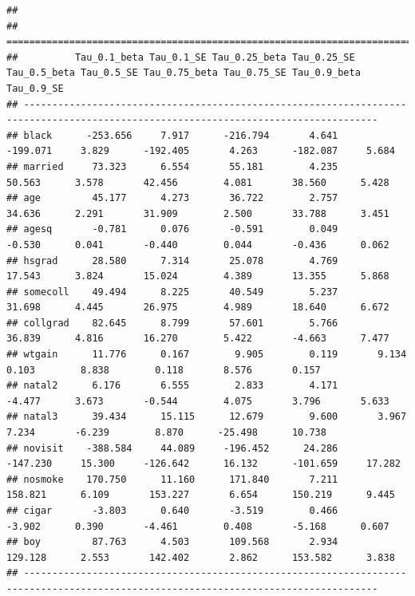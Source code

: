 \documentclass[]{book}
\begin{document}
\begin{verbatim}
## 
## ====================================================================================================================================
##          Tau_0.1_beta Tau_0.1_SE Tau_0.25_beta Tau_0.25_SE Tau_0.5_beta Tau_0.5_SE Tau_0.75_beta Tau_0.75_SE Tau_0.9_beta Tau_0.9_SE
## ------------------------------------------------------------------------------------------------------------------------------------
## black      -253.656     7.917      -216.794       4.641      -199.071     3.829      -192.405       4.263      -182.087     5.684   
## married     73.323      6.554       55.181        4.235       50.563      3.578       42.456        4.081       38.560      5.428   
## age         45.177      4.273       36.722        2.757       34.636      2.291       31.909        2.500       33.788      3.451   
## agesq       -0.781      0.076       -0.591        0.049       -0.530      0.041       -0.440        0.044       -0.436      0.062   
## hsgrad      28.580      7.314       25.078        4.769       17.543      3.824       15.024        4.389       13.355      5.868   
## somecoll    49.494      8.225       40.549        5.237       31.698      4.445       26.975        4.989       18.640      6.672   
## collgrad    82.645      8.799       57.601        5.766       36.839      4.816       16.270        5.422       -4.663      7.477   
## wtgain      11.776      0.167        9.905        0.119       9.134       0.103        8.838        0.118       8.576       0.157   
## natal2      6.176       6.555        2.833        4.171       -4.477      3.673       -0.544        4.075       3.796       5.633   
## natal3      39.434      15.115      12.679        9.600       3.967       7.234       -6.239        8.870      -25.498      10.738  
## novisit    -388.584     44.089     -196.452      24.286      -147.230     15.300     -126.642      16.132      -101.659     17.282  
## nosmoke    170.750      11.160      171.840       7.211      158.821      6.109       153.227       6.654      150.219      9.445   
## cigar       -3.803      0.640       -3.519        0.466       -3.902      0.390       -4.461        0.408       -5.168      0.607   
## boy         87.763      4.503       109.568       2.934      129.128      2.553       142.402       2.862      153.582      3.838   
## ------------------------------------------------------------------------------------------------------------------------------------
\end{verbatim}
\end{document}
